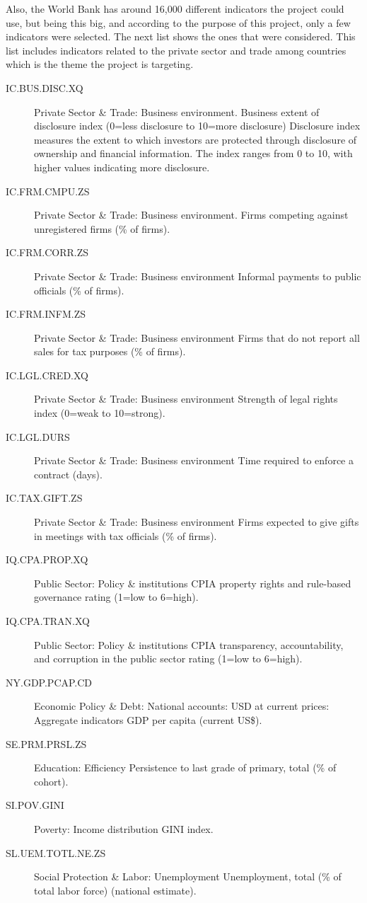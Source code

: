 Also, the World Bank has around 16,000 different indicators the project could use, but being this big, and according to the purpose of this project, only a few indicators were selected. The next list shows the ones that were considered. This list includes indicators related to the private sector and trade among countries which is the theme the project is targeting.

\begin{description}
\item[IC.BUS.DISC.XQ]	Private Sector \& Trade: Business environment. Business extent of disclosure index (0=less disclosure to 10=more disclosure)	Disclosure index measures the extent to which investors are protected through disclosure of ownership and financial information. The index ranges from 0 to 10, with higher values indicating more disclosure.
\item[IC.FRM.CMPU.ZS]	Private Sector \& Trade: Business environment. Firms competing against unregistered firms (\% of firms).
\item[IC.FRM.CORR.ZS]	Private Sector \& Trade: Business environment	Informal payments to public officials (\% of firms).
\item[IC.FRM.INFM.ZS]	Private Sector \& Trade: Business environment	Firms that do not report all sales for tax purposes (\% of firms).
\item[IC.LGL.CRED.XQ]	Private Sector \& Trade: Business environment	Strength of legal rights index (0=weak to 10=strong).
\item[IC.LGL.DURS]	Private Sector \& Trade: Business environment	Time required to enforce a contract (days).
\item[IC.TAX.GIFT.ZS]	Private Sector \& Trade: Business environment	Firms expected to give gifts in meetings with tax officials (\% of firms).
\item[IQ.CPA.PROP.XQ]	Public Sector: Policy \& institutions	CPIA property rights and rule-based governance rating (1=low to 6=high).
\item[IQ.CPA.TRAN.XQ]	Public Sector: Policy \& institutions	CPIA transparency, accountability, and corruption in the public sector rating (1=low to 6=high).
\item[NY.GDP.PCAP.CD]	Economic Policy \& Debt: National accounts: USD at current prices: Aggregate indicators	GDP per capita (current US\$).
\item[SE.PRM.PRSL.ZS]	Education: Efficiency	Persistence to last grade of primary, total (\% of cohort).
\item[SI.POV.GINI]	Poverty: Income distribution GINI index.
\item[SL.UEM.TOTL.NE.ZS]	Social Protection \& Labor: Unemployment	Unemployment, total (\% of total labor force) (national estimate).
\end{description}

